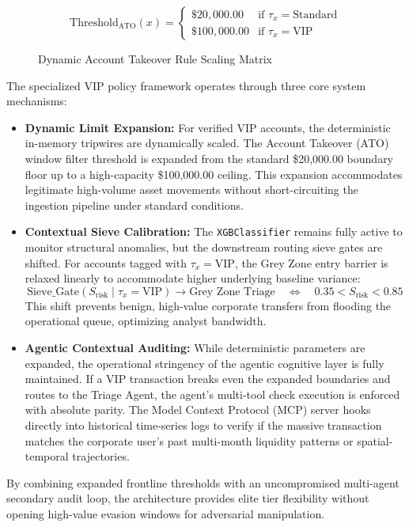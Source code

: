 \documentclass[12pt]{report}
\begin{document}
\begin{figure}[H]
    \centering
    $$
        \text{Threshold}_{\text{ATO}}(x) = 
        \begin{cases} 
            \$20,000.00 & \text{if } \tau_{x} = \text{Standard} \\
            \$100,000.00 & \text{if } \tau_{x} = \text{VIP}
        \end{cases}
    $$
    \caption{Dynamic Account Takeover Rule Scaling Matrix}
\end{figure}
The specialized VIP policy framework operates through three core system mechanisms:
\begin{itemize}
    \item \textbf{Dynamic Limit Expansion:} For verified VIP accounts, the deterministic in-memory tripwires are dynamically scaled. The Account Takeover (ATO) window filter threshold is expanded from the standard \$20,000.00 boundary floor up to a high-capacity \$100,000.00 ceiling. This expansion accommodates legitimate high-volume asset movements without short-circuiting the ingestion pipeline under standard conditions.
    \item \textbf{Contextual Sieve Calibration:} The \texttt{XGBClassifier} remains fully active to monitor structural anomalies, but the downstream routing sieve gates are shifted. For accounts tagged with $\tau_{x} = \text{VIP}$, the Grey Zone entry barrier is relaxed linearly to accommodate higher underlying baseline variance:
    $$
        \text{Sieve\_Gate}(S_{\text{risk}} \mid \tau_{x} = \text{VIP}) \rightarrow \text{Grey Zone Triage} \quad \iff \quad 0.35 < S_{\text{risk}} < 0.85
    $$
    This shift prevents benign, high-value corporate transfers from flooding the operational queue, optimizing analyst bandwidth.
    \item \textbf{Agentic Contextual Auditing:} While deterministic parameters are expanded, the operational stringency of the agentic cognitive layer is fully maintained. If a VIP transaction breaks even the expanded boundaries and routes to the Triage Agent, the agent's multi-tool check execution is enforced with absolute parity. The Model Context Protocol (MCP) server hooks directly into historical time-series logs to verify if the massive transaction matches the corporate user's past multi-month liquidity patterns or spatial-temporal trajectories. 
\end{itemize}
By combining expanded frontline thresholds with an uncompromised multi-agent secondary audit loop, the architecture provides elite tier flexibility without opening high-value evasion windows for adversarial manipulation.
\end{document}
